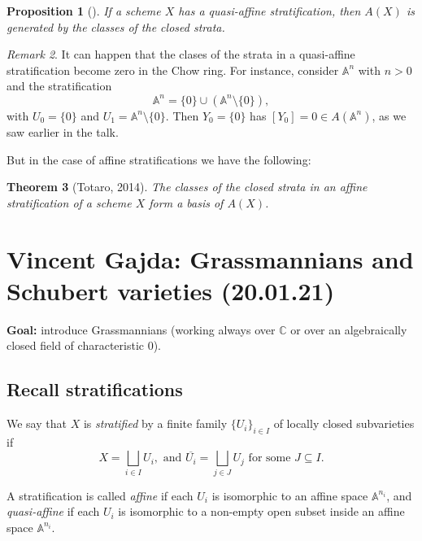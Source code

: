 \documentclass[12pt,a4paper]{amsart}
\theoremstyle{plain}
\newtheorem{thm}{Theorem}
\newtheorem{prop}[thm]{Proposition}
\theoremstyle{definition}
\theoremstyle{remark}
\newtheorem{rem}[thm]{Remark}
\begin{document}
\begin{prop}[{\cite[Proposition 1.17]{eh16}}]
    If a scheme $X$ has a quasi-affine stratification, then $A(X)$ is generated by the classes of the closed strata.
\end{prop}

\begin{rem}
    It can happen that the clases of the strata in a quasi-affine stratification become zero in the Chow ring.
    For instance, consider $\mathbb{A}^{n}$ with $n>0$ and the stratification
    \[ \mathbb{A}^{n}=\{0\}\cup (\mathbb{A}^{n}\setminus \{ 0 \}), \]
    with $U_{0}=\{0\}$ and $U_{1}=\mathbb{A}^{n}\setminus \{0\}$.
    Then $Y_{0}=\{ 0\}$ has $[Y_{0}]=0\in A(\mathbb{A}^{n})$, as we saw earlier in the talk.
\end{rem}

But in the case of affine stratifications we have the following:

\begin{thm}[Totaro, 2014]
    The classes of the closed strata in an affine stratification of a scheme $X$ form a basis of $A(X)$.
\end{thm}

\section{Vincent Gajda: Grassmannians and Schubert varieties (20.01.21)}

\textbf{Goal:} introduce Grassmannians (working always over $\mathbb{C}$ or over an algebraically closed field of characteristic $0$).

\subsection{Recall stratifications}

We say that $X$ is \textit{stratified} by a finite family $\{U_{i}\}_{i\in I}$ of locally closed subvarieties if
\[ X=\bigsqcup_{i\in I}U_{i}, \text{ and } \overline{U_{i}}=\bigsqcup_{j\in J}U_{j} \text{ for some }J\subseteq I. \]

A stratification is called \textit{affine} if each $U_{i}$ is isomorphic to an affine space $\mathbb{A}^{n_{i}}$, and \textit{quasi-affine} if each $U_{i}$ is isomorphic to a non-empty open subset inside an affine space $\mathbb{A}^{n_{i}}$.
\end{document}
